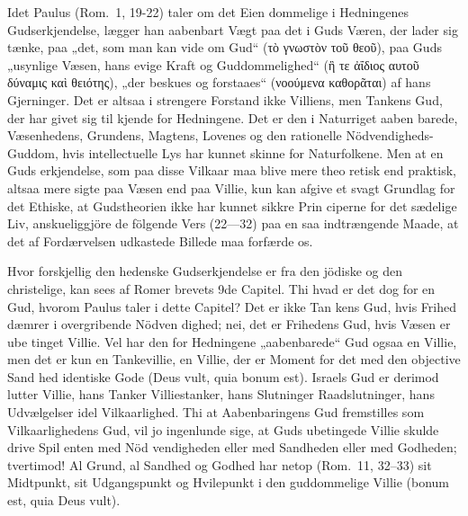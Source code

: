 \documentclass[12pt,a4paper]{article}
\newcommand{\opage}[1]{\marginnote{\footnotesize\textit{[#1]}}}
\begin{document}
Idet Paulus (Rom.\ 1, 19-22) taler om det Eien\-%
dommelige i Hedningenes Gudserkjendelse, lægger han
aabenbart Vægt paa det i Guds Væren, der lader sig
tænke, paa „det, som man kan vide om Gud“ (τὸ γνωστὸν
τοῦ θεοῦ), paa Guds „usynlige Væsen, hans evige Kraft
og Guddommelighed“ (ἣ τε ἀΐδιος αυτοῦ δύναμις καὶ
θειότης), „der beskues og forstaaes“ (νοούμενα καθορᾶται)
af hans Gjerninger. Det er altsaa i strengere Forstand
ikke Villiens, men Tankens Gud, der har givet sig til\-%
kjende for Hedningene. Det er den i Naturriget aaben\-%
barede, Væsenhedens, Grundens, Magtens, Lovenes og
den rationelle Nödvendigheds-Guddom, hvis intellectuelle
Lys har kunnet skinne for Naturfolkene. Men at en Guds\-%
erkjendelse, som paa disse Vilkaar maa blive mere theo\-%
retisk end praktisk, altsaa mere sigte paa Væsen end
paa Villie, kun kan afgive et svagt Grundlag for det
Ethiske, at Gudstheorien ikke har kunnet sikkre Prin\-%
ciperne for det sædelige Liv, anskueliggjöre de fölgende
Vers (22---32) paa en saa indtrængende Maade, at det
af Fordærvelsen udkastede Billede maa forfærde os.

Hvor forskjellig den hedenske Gudserkjendelse er
fra den jödiske og den christelige, kan sees af Romer\-%
brevets 9de Capitel. Thi hvad er det dog for en Gud,
hvorom Paulus taler i dette Capitel? Det er ikke Tan\-%
kens Gud, hvis Frihed dæmrer i overgribende Nödven\-%
dighed; nei, det er Frihedens Gud, hvis Væsen er ube\-%
tinget Villie. Vel har den for Hedningene „aabenbarede“
Gud ogsaa en Villie, men det er kun en Tankevillie, en
Villie, der er Moment for det med den objective Sand\-%
hed identiske Gode (Deus vult, quia bonum est). Israels
Gud er derimod lutter Villie, hans Tanker Villiestanker,
\opage{75}hans Slutninger Raadslutninger, hans Udvælgelser idel
Vilkaarlighed. Thi at Aabenbaringens Gud fremstilles
som Vilkaarlighedens Gud, vil jo ingenlunde sige, at
Guds ubetingede Villie skulde drive Spil enten med Nöd\-%
vendigheden eller med Sandheden eller med Godheden;
tvertimod! Al Grund, al Sandhed og Godhed har netop
(Rom.\ 11, 32--33) sit Midtpunkt, sit Udgangspunkt og
Hvilepunkt i den guddommelige Villie (bonum est, quia
Deus vult).
\end{document}
